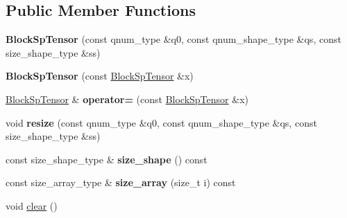 \subsection*{Public Member Functions}
\begin{DoxyCompactItemize}
\item 
\hypertarget{classbtas_1_1_block_sp_tensor_a96cf1ebb1d6a915f59d8ea43c448ce0c}{
{\bfseries BlockSpTensor} (const qnum\_\-type \&q0, const qnum\_\-shape\_\-type \&qs, const size\_\-shape\_\-type \&ss)}
\label{classbtas_1_1_block_sp_tensor_a96cf1ebb1d6a915f59d8ea43c448ce0c}

\item 
\hypertarget{classbtas_1_1_block_sp_tensor_a77dc9b561611a0151931948b78dde177}{
{\bfseries BlockSpTensor} (const \hyperlink{classbtas_1_1_block_sp_tensor}{BlockSpTensor} \&x)}
\label{classbtas_1_1_block_sp_tensor_a77dc9b561611a0151931948b78dde177}

\item 
\hypertarget{classbtas_1_1_block_sp_tensor_a0b51a4cb61de02891b21ee9c010aca51}{
\hyperlink{classbtas_1_1_block_sp_tensor}{BlockSpTensor} \& {\bfseries operator=} (const \hyperlink{classbtas_1_1_block_sp_tensor}{BlockSpTensor} \&x)}
\label{classbtas_1_1_block_sp_tensor_a0b51a4cb61de02891b21ee9c010aca51}

\item 
\hypertarget{classbtas_1_1_block_sp_tensor_ad6d51cb6cf8b78a26ddda6fdd6ed2a68}{
void {\bfseries resize} (const qnum\_\-type \&q0, const qnum\_\-shape\_\-type \&qs, const size\_\-shape\_\-type \&ss)}
\label{classbtas_1_1_block_sp_tensor_ad6d51cb6cf8b78a26ddda6fdd6ed2a68}

\item 
\hypertarget{classbtas_1_1_block_sp_tensor_a6550007e6c75e316a04375c38c94e187}{
const size\_\-shape\_\-type \& {\bfseries size\_\-shape} () const }
\label{classbtas_1_1_block_sp_tensor_a6550007e6c75e316a04375c38c94e187}

\item 
\hypertarget{classbtas_1_1_block_sp_tensor_ac9e10e5b26666b5e6c898e000d128a81}{
const size\_\-array\_\-type \& {\bfseries size\_\-array} (size\_\-t i) const }
\label{classbtas_1_1_block_sp_tensor_ac9e10e5b26666b5e6c898e000d128a81}

\item 
\hypertarget{classbtas_1_1_block_sp_tensor_acf9840e99ac75db739adc49d3a17115f}{
void \hyperlink{classbtas_1_1_block_sp_tensor_acf9840e99ac75db739adc49d3a17115f}{clear} ()}
\label{classbtas_1_1_block_sp_tensor_acf9840e99ac75db739adc49d3a17115f}


\end{DoxyCompactItemize}
